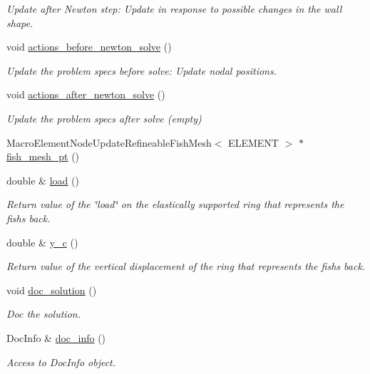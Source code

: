\begin{DoxyCompactItemize}
\begin{DoxyCompactList}\small\item\em Update after Newton step\+: Update in response to possible changes in the wall shape. \end{DoxyCompactList}\item 
void \hyperlink{classRefineableFishPoissonProblem_a58098181f3b88c2fc65f24fb15c1a529}{actions\+\_\+before\+\_\+newton\+\_\+solve} ()
\begin{DoxyCompactList}\small\item\em Update the problem specs before solve\+: Update nodal positions. \end{DoxyCompactList}\item 
void \hyperlink{classRefineableFishPoissonProblem_a7f6c356f7c8bd0130de957297e999f40}{actions\+\_\+after\+\_\+newton\+\_\+solve} ()
\begin{DoxyCompactList}\small\item\em Update the problem specs after solve (empty) \end{DoxyCompactList}\item 
Macro\+Element\+Node\+Update\+Refineable\+Fish\+Mesh$<$ E\+L\+E\+M\+E\+NT $>$ $\ast$ \hyperlink{classRefineableFishPoissonProblem_ab472201df89d71930157fbc45b8eaa54}{fish\+\_\+mesh\+\_\+pt} ()
\item 
double \& \hyperlink{classRefineableFishPoissonProblem_a20702e8945d442c9597348b550da14e4}{load} ()
\begin{DoxyCompactList}\small\item\em Return value of the \char`\"{}load\char`\"{} on the elastically supported ring that represents the fish\textquotesingle{}s back. \end{DoxyCompactList}\item 
double \& \hyperlink{classRefineableFishPoissonProblem_a152227cc825ddea07cb06c2791f5995b}{y\+\_\+c} ()
\begin{DoxyCompactList}\small\item\em Return value of the vertical displacement of the ring that represents the fish\textquotesingle{}s back. \end{DoxyCompactList}\item 
void \hyperlink{classRefineableFishPoissonProblem_a6db25ff0bd3014aa531d9f0e8b385beb}{doc\+\_\+solution} ()
\begin{DoxyCompactList}\small\item\em Doc the solution. \end{DoxyCompactList}\item 
Doc\+Info \& \hyperlink{classRefineableFishPoissonProblem_a093f5963e63746843c33ca444a205333}{doc\+\_\+info} ()
\begin{DoxyCompactList}\small\item\em Access to Doc\+Info object. \end{DoxyCompactList}\end{DoxyCompactItemize}
